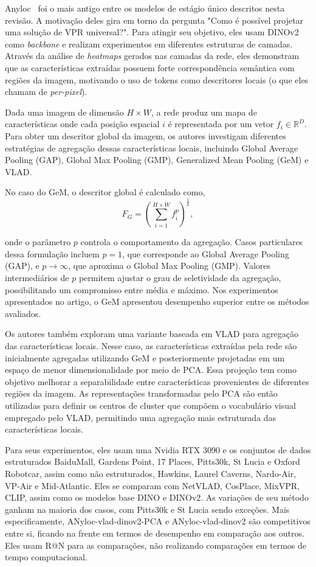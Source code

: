 \documentclass[letterpaper, 10 pt, conference]{ieeeconf}  %
\begin{document}
Anyloc~\cite{anyloc} foi o mais antigo entre os modelos de estágio único descritos nesta revisão. A motivação deles gira em torno da pergunta "Como é possível projetar uma solução de VPR universal?". Para atingir seu objetivo, eles usam DINOv2 como \textit{backbone} e realizam experimentos em diferentes estruturas de camadas. Através da análise de \textit{heatmaps} gerados nas camadas da rede, eles demonstram que as características extraídas possuem forte correspondência semântica com regiões da imagem, motivando o uso de tokens como descritores locais (o que eles chamam de \textit{per-pixel}).

Dada uma imagem de dimensão $H \times W$, a rede produz um mapa de características onde cada posição espacial $i$ é representada por um vetor $f_i \in \mathbb{R}^D$. Para obter um descritor global da imagem, os autores investigam diferentes estratégias de agregação dessas características locais, incluindo Global Average Pooling (GAP), Global Max Pooling (GMP), Generalized Mean Pooling (GeM) e VLAD.

No caso do GeM, o descritor global é calculado como,
$$
F_G = \left( \sum_{i=1}^{H \times W} f_i^p \right)^{\frac{1}{p}},
$$

onde o parâmetro $p$ controla o comportamento da agregação. Casos particulares dessa formulação incluem $p=1$, que corresponde ao Global Average Pooling (GAP), e $p \rightarrow \infty$, que aproxima o Global Max Pooling (GMP). Valores intermediários de $p$ permitem ajustar o grau de seletividade da agregação, possibilitando um compromisso entre média e máximo. Nos experimentos apresentados no artigo, o GeM apresentou desempenho superior entre os métodos avaliados.

Os autores também exploram uma variante baseada em VLAD para agregação das características locais. Nesse caso, as características extraídas pela rede são inicialmente agregadas utilizando GeM e posteriormente projetadas em um espaço de menor dimensionalidade por meio de PCA. Essa projeção tem como objetivo melhorar a separabilidade entre características provenientes de diferentes regiões da imagem. As representações transformadas pelo PCA são então utilizadas para definir os centros de cluster que compõem o vocabulário visual empregado pelo VLAD, permitindo uma agregação mais estruturada das características locais.


Para seus experimentos, eles usam uma Nvidia RTX 3090 e os conjuntos de dados estruturados BaiduMall, Gardens Point, 17 Places, Pitts30k, St Lucia e Oxford Robotcar, assim como não estruturados, Hawkins, Laurel Caverns, Nardo-Air, VP-Air e Mid-Atlantic. Eles se comparam com NetVLAD, CosPlace, MixVPR, CLIP, assim como os modelos base DINO e DINOv2. As variações de seu método ganham na maioria dos casos, com Pitts30k e St Lucia sendo exceções. Mais especificamente, ANyloc-vlad-dinov2-PCA e ANyloc-vlad-dinov2 são competitivos entre si, ficando na frente em termos de desempenho em comparação aos outros. Eles usam R@N para as comparações, não realizando comparações em termos de tempo computacional.
\end{document}
